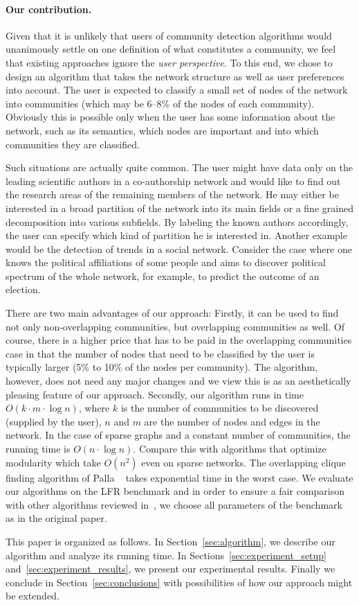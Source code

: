 \paragraph{Our contribution.}
Given that it is unlikely that users of community detection algorithms 
would unanimously settle on one definition of what constitutes a community, 
we feel that existing approaches ignore the \emph{user perspective}.
To this end, we chose to design an algorithm that takes the network structure 
as well as user preferences into account. 
The user is expected to classify a small set of nodes of the network 
into communities (which may be 6--8\% of the nodes of each community).
Obviously this is possible only when the user has some 
information about the network, such as its semantics, which nodes 
are important and into which communities they are classified. 

Such situations are actually quite common. The user might have data only on the
leading scientific authors in a co-authorship network and would like to find out
the research areas of the remaining members of the network.  He may either be
interested in a broad partition of the network into its main fields or a
fine grained decomposition into various subfields.  By labeling the known
authors accordingly, the user can specify which kind of partition he is
interested in.  Another example would be the detection of trends in a social
network.  Consider the case where one knows the political affiliations of some
people and aims to discover political spectrum of the whole network, for
example, to predict the outcome of an election. 

There are two main advantages of our approach: Firstly, it can be used to find
not only non-overlapping communities, but overlapping communities as well. Of
course, there is a higher price that has to be paid in the overlapping
communities case in that the number of nodes that need to be classified by the
user is typically larger (5\% to 10\% of the nodes per community). The
algorithm, however, does not need any major changes and we view this is as an
aesthetically pleasing feature of our approach.  Secondly, our algorithm runs in
time $O(k \cdot m \cdot \log n)$, where $k$ is the number of communities to be
discovered (supplied by the user), $n$ and $m$ are the number of nodes and edges
in the network. In the case of sparse graphs and a constant number of
communities, the running time is $O(n \cdot \log n)$.  Compare this with
algorithms that optimize modularity which take $O(n^2)$ even on sparse
networks. The overlapping clique finding algorithm of Palla \etal~\cite{PDFV05}
takes exponential time in the worst case. We evaluate our algorithms on the LFR
benchmark and in order to ensure a fair comparison with other algorithms
reviewed in~\cite{LF09}, we choose all parameters of the benchmark as in the
original paper.

This paper is organized as follows. In Section~\ref{sec:algorithm}, we 
describe our algorithm and analyze its running time. In Sections~\ref{sec:experiment_setup} 
and~\ref{sec:experiment_results}, we present our experimental results. Finally we conclude 
in Section~\ref{sec:conclusions} with possibilities of how our approach might be extended. 



